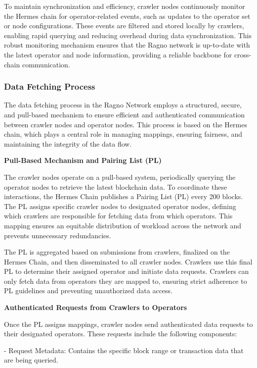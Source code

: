To maintain synchronization and efficiency, crawler nodes continuously monitor the Hermes chain for operator-related events, such as updates to the operator set or node configurations. These events are filtered and stored locally by crawlers, enabling rapid querying and reducing overhead during data synchronization. This robust monitoring mechanism ensures that the Ragno network is up-to-date with the latest operator and node information, providing a reliable backbone for cross-chain communication.

\subsubsection{Data Fetching Process}
The data fetching process in the Ragno Network employs a structured, secure, and pull-based mechanism to ensure efficient and authenticated communication between crawler nodes and operator nodes. This process is based on the Hermes chain, which plays a central role in managing mappings, ensuring fairness, and maintaining the integrity of the data flow.

\textbf{Pull-Based Mechanism and Pairing List (PL)}

The crawler nodes operate on a pull-based system, periodically querying the operator nodes to retrieve the latest blockchain data. To coordinate these interactions, the Hermes Chain publishes a Pairing List (PL) every 200 blocks. The PL assigns specific crawler nodes to designated operator nodes, defining which crawlers are responsible for fetching data from which operators. This mapping ensures an equitable distribution of workload across the network and prevents unnecessary redundancies.

The PL is aggregated based on submissions from crawlers, finalized on the Hermes Chain, and then disseminated to all crawler nodes. Crawlers use this final PL to determine their assigned operator and initiate data requests. Crawlers can only fetch data from operators they are mapped to, ensuring strict adherence to PL guidelines and preventing unauthorized data access.

\textbf{Authenticated Requests from Crawlers to Operators}

Once the PL assigns mappings, crawler nodes send authenticated data requests to their designated operators. These requests include the following components:  

- Request Metadata: Contains the specific block range or transaction data that are being queried.  

